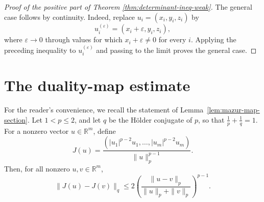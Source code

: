 \documentclass[11pt,a4paper]{amsart}
\theoremstyle{plain}
\theoremstyle{definition}
\newcommand{\R}{\mathbb R}
\begin{document}
\begin{proof}[Proof of the positive part of Theorem \ref{thm:determinant-ineq-weak}]
    The general case follows by continuity. Indeed, replace
\(u_i=(x_i,y_i,z_i)\) by
\[
    u_i^{(\varepsilon)}=(x_i+\varepsilon,y_i,z_i),
\]
where \(\varepsilon\to0\) through values for which
\(x_i+\varepsilon\ne0\) for every \(i\). Applying the preceding
inequality to \(u_i^{(\varepsilon)}\) and passing to the limit proves
the general case.
\end{proof}


\appendix
\section{The duality-map estimate}\label{app:duality-map}
For the reader's convenience, we recall the statement of
Lemma~\ref{lem:mazur-map-section}. Let $1<p\leq2$, and let $q$ be the
H\"older conjugate of $p$, so that
$
\frac{1}{p}+\frac{1}{q}=1.
$
For a nonzero vector $u\in\R^m$, define
$$
J(u)=
\frac{(|u_1|^{p-2}u_1,\ldots,|u_m|^{p-2}u_m)}
{\|u\|_p^{p-1}}.
$$
Then, for all nonzero $u,v\in\R^m$,
$$
\|J(u)-J(v)\|_q
\leq
2\left(
\frac{\|u-v\|_p}{\|u\|_p+\|v\|_p}
\right)^{p-1}.
$$
\end{document}
